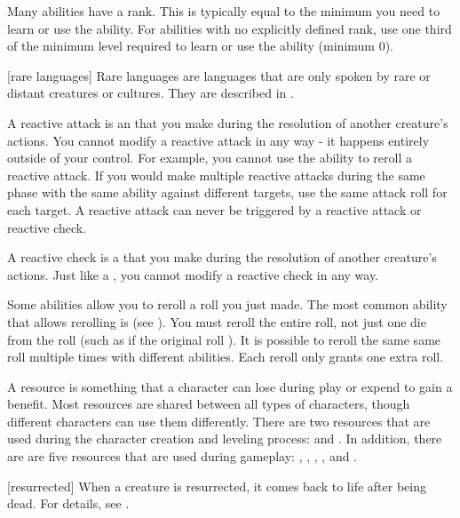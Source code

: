  Many abilities have a rank.
This is typically equal to the minimum  you need to learn or use the ability.
For abilities with no explicitly defined rank, use one third of the minimum level required to learn or use the ability (minimum 0).

[rare languages] Rare languages are languages that are only spoken by rare or distant creatures or cultures.
They are described in .

 A reactive attack is an  that you make during the resolution of another creature's actions.
You cannot modify a reactive attack in any way - it happens entirely outside of your control.
For example, you cannot use the  ability to reroll a reactive attack.
If you would make multiple reactive attacks during the same phase with the same ability against different targets, use the same attack roll for each target.
A reactive attack can never be triggered by a reactive attack or reactive check.

 A reactive check is a  that you make during the resolution of another creature's actions.
Just like a , you cannot modify a reactive check in any way.

 Some abilities allow you to reroll a roll you just made.
The most common ability that allows rerolling is  (see ).
You must reroll the entire roll, not just one die from the roll (such as if the original roll ).
It is possible to reroll the same same roll multiple times with different abilities.
Each reroll only grants one extra roll.

 A resource is something that a character can lose during play or expend to gain a benefit.
Most resources are shared between all types of characters, though different characters can use them differently.
There are two resources that are used during the character creation and leveling process:  and .
In addition, there are are five resources that are used during gameplay: , , , , and .

[resurrected] When a creature is resurrected, it comes back to life after being dead.
For details, see .

